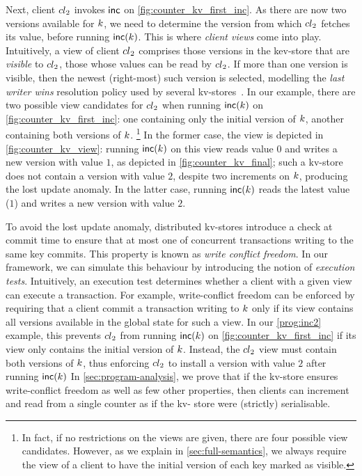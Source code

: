 Next, client ${cl}_2$ invokes $\mathsf{inc}$ on \cref{fig:counter_kv_first_inc}. 
As there are now two versions available for $k$, 
we need to determine the version from which ${cl}_2$ fetches its value, before running $\mathsf{inc}(k)$.
This is where \emph{client views} come into play.
Intuitively, a view of client ${cl}_2$ comprises those versions in the kev-store that are \emph{visible} to ${cl}_2$, 
\ie those whose values can be read by ${cl}_2$. 
If more than one version is visible, then the newest (right-most) such version is selected, 
modelling the \emph{last writer wins} resolution policy used by several kv-stores~\cite{vogels:2009:ec:1435417.1435432}. 
In our example, there are two possible view candidates for ${cl}_2$ when running $\mathsf{inc}(k)$ on \cref{fig:counter_kv_first_inc}: 
one containing only the initial version of $k$, 
another containing both versions of $k$.%
\footnote{In fact, if no restrictions on the views are given, there 
are four possible view candidates. 
However, as we explain in \cref{sec:full-semantics}, we always require the view of a client 
to have the initial version of each key marked as visible.}
In the former case, the view is depicted in \cref{fig:counter_kv_view}:
running $\mathsf{inc}(k)$ on this view reads value $0$ and writes a new version with value $1$, as depicted in \cref{fig:counter_kv_final};
such a kv-store does not contain a version with value $2$, despite two increments on $k$, producing the lost update anomaly.
In the latter case, running $\mathsf{inc}(k)$ reads the latest value ($1$) and writes a new version with value $2$.

To avoid the lost update anomaly, distributed kv-stores introduce a check at commit time to ensure that 
at most one of concurrent transactions writing to the same key commits. 
This property is known as \emph{write conflict freedom}. 
In our framework, we can simulate this behaviour by introducing the notion of \emph{execution tests}. 
Intuitively, an execution test determines whether a client with a given view can execute a transaction. 
For example, write-conflict freedom can be enforced by requiring that a client commit a transaction writing to $k$ 
only if its view contains all versions available in the global state for such a view. 
In our \eqref{prog:inc2} example, this prevents ${cl}_2$ from running $\mathsf{inc}(k)$ on \cref{fig:counter_kv_first_inc}
if its view only contains the initial version of $k$. 
Instead, the ${cl}_2$ view must contain both versions of $k$, 
thus enforcing ${cl}_2$ to install a version with value $2$ after running $\mathsf{inc}(k)$
In \cref{sec:program-analysis}, we prove that if the kv-store 
ensures write-conflict freedom as well as few other properties, then clients can increment 
and read from a single counter as if the kv- store were (strictly) serialisable.

